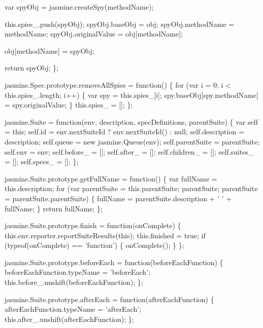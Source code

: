 \begin{DoxyCodeInclude}
  var spyObj = jasmine.createSpy(methodName);

  this.spies\_.push(spyObj);
  spyObj.baseObj = obj;
  spyObj.methodName = methodName;
  spyObj.originalValue = obj[methodName];

  obj[methodName] = spyObj;

  \textcolor{keywordflow}{return} spyObj;
\};

jasmine.Spec.prototype.removeAllSpies = \textcolor{keyword}{function}() \{
  \textcolor{keywordflow}{for} (var i = 0; i < this.spies\_.length; i++) \{
    var spy = this.spies\_[i];
    spy.baseObj[spy.methodName] = spy.originalValue;
  \}
  this.spies\_ = [];
\};

jasmine.Suite = \textcolor{keyword}{function}(env, description, specDefinitions, parentSuite) \{
  var \textcolor{keyword}{self} = \textcolor{keyword}{this};
  \textcolor{keyword}{self}.id = env.nextSuiteId ? env.nextSuiteId() : null;
  \textcolor{keyword}{self}.description = description;
  \textcolor{keyword}{self}.queue = \textcolor{keyword}{new} jasmine.Queue(env);
  \textcolor{keyword}{self}.parentSuite = parentSuite;
  \textcolor{keyword}{self}.env = env;
  \textcolor{keyword}{self}.before\_ = [];
  \textcolor{keyword}{self}.after\_ = [];
  \textcolor{keyword}{self}.children\_ = [];
  \textcolor{keyword}{self}.suites\_ = [];
  \textcolor{keyword}{self}.specs\_ = [];
\};

jasmine.Suite.prototype.getFullName = \textcolor{keyword}{function}() \{
  var fullName = this.description;
  \textcolor{keywordflow}{for} (var parentSuite = this.parentSuite; parentSuite; parentSuite = parentSuite.parentSuite) \{
    fullName = parentSuite.description + \textcolor{charliteral}{' '} + fullName;
  \}
  \textcolor{keywordflow}{return} fullName;
\};

jasmine.Suite.prototype.finish = \textcolor{keyword}{function}(onComplete) \{
  this.env.reporter.reportSuiteResults(\textcolor{keyword}{this});
  this.finished = \textcolor{keyword}{true};
  \textcolor{keywordflow}{if} (typeof(onComplete) == \textcolor{stringliteral}{'function'}) \{
    onComplete();
  \}
\};

jasmine.Suite.prototype.beforeEach = \textcolor{keyword}{function}(beforeEachFunction) \{
  beforeEachFunction.typeName = \textcolor{stringliteral}{'beforeEach'};
  this.before\_.unshift(beforeEachFunction);
\};

jasmine.Suite.prototype.afterEach = \textcolor{keyword}{function}(afterEachFunction) \{
  afterEachFunction.typeName = \textcolor{stringliteral}{'afterEach'};
  this.after\_.unshift(afterEachFunction);
\};


\end{DoxyCodeInclude}
